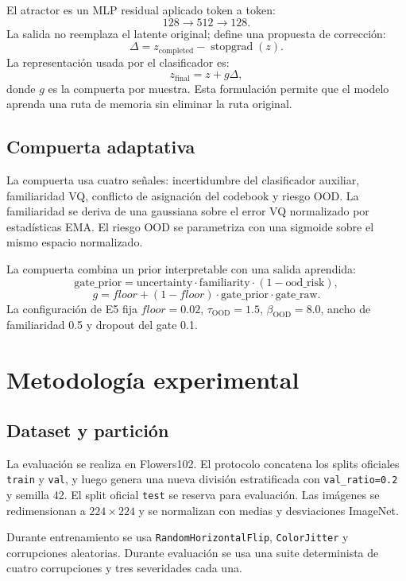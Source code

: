 \documentclass[11pt,a4paper]{article}
\begin{document}
El atractor es un MLP residual aplicado token a token:
\[
128 \rightarrow 512 \rightarrow 128.
\]
La salida no reemplaza el latente original; define una propuesta de corrección:
\[
\Delta = z_{\text{completed}} - \operatorname{stopgrad}(z).
\]
La representación usada por el clasificador es:
\[
z_{\text{final}} = z + g\Delta,
\]
donde $g$ es la compuerta por muestra. Esta formulación permite que el modelo
aprenda una ruta de memoria sin eliminar la ruta original.

\subsection{Compuerta adaptativa}

La compuerta usa cuatro señales: incertidumbre del clasificador auxiliar,
familiaridad VQ, conflicto de asignación del codebook y riesgo OOD. La
familiaridad se deriva de una gaussiana sobre el error VQ normalizado por
estadísticas EMA. El riesgo OOD se parametriza con una sigmoide sobre el mismo
espacio normalizado.

La compuerta combina un prior interpretable con una salida aprendida:
\[
\text{gate\_prior}
= \text{uncertainty}\cdot \text{familiarity}\cdot(1-\text{ood\_risk}),
\]
\[
g = floor + (1-floor)\cdot \text{gate\_prior}\cdot \text{gate\_raw}.
\]
La configuración de E5 fija $floor=0.02$, $\tau_{\mathrm{OOD}}=1.5$,
$\beta_{\mathrm{OOD}}=8.0$, ancho de familiaridad 0.5 y dropout del gate 0.1.

\section{Metodología experimental}

\subsection{Dataset y partición}

La evaluación se realiza en Flowers102. El protocolo concatena los splits
oficiales \texttt{train} y \texttt{val}, y luego genera una nueva división
estratificada con \texttt{val\_ratio=0.2} y semilla 42. El split oficial
\texttt{test} se reserva para evaluación. Las imágenes se redimensionan a
$224\times224$ y se normalizan con medias y desviaciones ImageNet.

Durante entrenamiento se usa \texttt{RandomHorizontalFlip},
\texttt{ColorJitter} y corrupciones aleatorias. Durante evaluación se usa una
suite determinista de cuatro corrupciones y tres severidades cada una.
\end{document}
